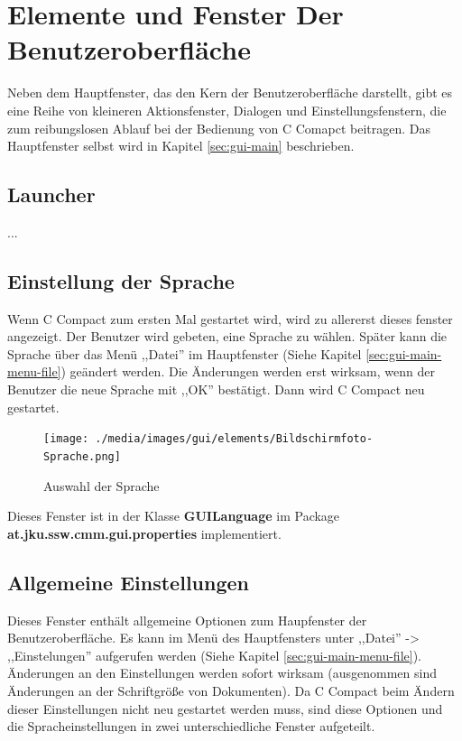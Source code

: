 \section{Elemente und Fenster Der Benutzeroberfläche}
Neben dem Hauptfenster, das den Kern der Benutzeroberfläche darstellt, gibt es eine Reihe von kleineren Aktionsfenster, Dialogen und Einstellungsfenstern, die zum reibungslosen Ablauf bei der Bedienung von C Comapct beitragen. Das Hauptfenster selbst wird in Kapitel \ref{sec:gui-main} beschrieben.

\subsection{Launcher}
\label{sec:win-launcher}
...

\subsection{Einstellung der Sprache}
\label{sec:win-lang}
Wenn C Compact zum ersten Mal gestartet wird, wird zu allererst dieses fenster angezeigt. Der Benutzer wird gebeten, eine Sprache zu wählen. Später kann die Sprache über das Menü ,,Datei'' im Hauptfenster (Siehe Kapitel \ref{sec:gui-main-menu-file}) geändert werden. Die Änderungen werden erst wirksam, wenn der Benutzer die neue Sprache mit ,,OK'' bestätigt. Dann wird C Compact neu gestartet.

\begin{figure}[htp]
\centering
\texttt{[image: ./media/images/gui/elements/Bildschirmfoto-Sprache.png]}
\caption{Auswahl der Sprache}
\label{fig:win-lang}
\end{figure}

Dieses Fenster ist in der Klasse \textbf{GUILanguage} im Package \textbf{at.jku.ssw.cmm.gui.properties} implementiert. 

\subsection{Allgemeine Einstellungen}
\label{sec:win-set}
Dieses Fenster enthält allgemeine Optionen zum Haupfenster der Benutzeroberfläche. Es kann im Menü des Hauptfensters unter ,,Datei'' -> ,,Einstelungen'' aufgerufen werden (Siehe Kapitel \ref{sec:gui-main-menu-file}). Änderungen an den Einstellungen werden sofort wirksam (ausgenommen sind Änderungen an der Schriftgröße von Dokumenten). Da C Compact beim Ändern dieser Einstellungen nicht neu gestartet werden muss, sind diese Optionen und die Spracheinstellungen in zwei unterschiedliche Fenster aufgeteilt.


